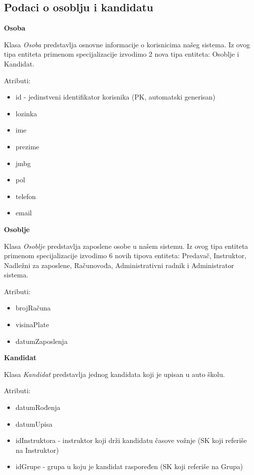 \subsection{Podaci o osoblju i kandidatu}

\textbf{\large Osoba}
\vspace{0.3cm}

Klasa \textit{Osoba} predstavlja osnovne informacije o korisnicima našeg sistema. 
Iz ovog tipa entiteta primenom specijalizacije izvodimo 2 nova tipa entiteta: Osoblje i Kandidat.

Atributi:
\begin{itemize}
    \item id - jedinstveni identifikator korisnika (PK, automatski generisan)
    \item lozinka 
    \item ime
    \item prezime
    \item jmbg
    \item pol
    \item telefon
    \item email
\end{itemize}

\textbf{\large Osoblje}
\vspace{0.3cm}

Klasa \textit{Osoblje} predstavlja zaposlene osobe u našem sistemu.
Iz ovog tipa entiteta primenom specijalizacije izvodimo 6 novih tipova entiteta: 
Predavač, Instruktor, Nadležni za zaposlene, Računovođa, Administrativni radnik i Administrator sistema.

Atributi:
\begin{itemize}
    \item brojRačuna
    \item visinaPlate
    \item datumZaposlenja
\end{itemize}

\textbf{\large Kandidat}
\vspace{0.3cm}

Klasa \textit{Kandidat} predstavlja jednog kandidata koji je upisan u auto školu.

Atributi:
\begin{itemize}
    \item datumRođenja
    \item datumUpisa
    \item idInstruktora - instruktor koji drži kandidatu časove vožnje (SK koji referiše na Instruktor)
    \item idGrupe - grupa u koju je kandidat raspoređen (SK koji referiše na Grupa)
\end{itemize}


